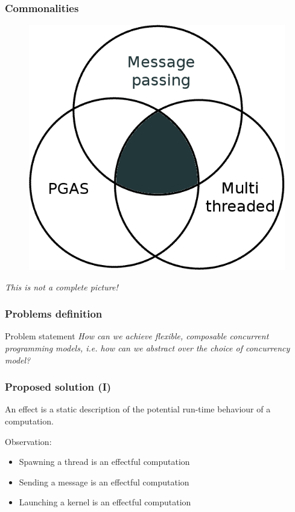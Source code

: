 \documentclass[10pt,compress]{beamer}
\begin{document}
  \begin{frame}
    \frametitle{Commonalities}
    \begin{center}
      \begin{figure}
        \includegraphics[scale=0.3]{venn.png}
      \end{figure}
    \end{center}

    \emph{\tiny{This is not a complete picture!}}
  \end{frame}

  \begin{frame}
    \frametitle{Problems definition}
    \begin{block}{Problem statement}
      \emph{How can we achieve flexible, composable concurrent programming models, i.e. how can we abstract over the choice of concurrency model?}
    \end{block}
  \end{frame}

  \begin{frame}
    \frametitle{Proposed solution (I)}
    \begin{definition}[Effect]
      An effect is a static description of the potential run-time behaviour of a computation.
    \end{definition}
    Observation:
    \begin{itemize}
      \item Spawning a thread is an effectful computation
      \item Sending a message is an effectful computation
      \item Launching a kernel is an effectful computation
    \end{itemize}
  \end{frame}
\end{document}
